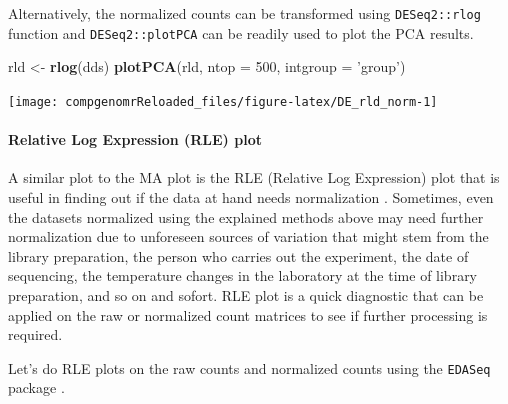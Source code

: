 \documentclass[12pt,]{krantz}
\newenvironment{Shaded}{\begin{snugshade}}{\end{snugshade}}
\newcommand{\DataTypeTok}[1]{\textcolor[rgb]{0.13,0.29,0.53}{#1}}
\newcommand{\DecValTok}[1]{\textcolor[rgb]{0.00,0.00,0.81}{#1}}
\newcommand{\KeywordTok}[1]{\textcolor[rgb]{0.13,0.29,0.53}{\textbf{#1}}}
\newcommand{\NormalTok}[1]{#1}
\newcommand{\StringTok}[1]{\textcolor[rgb]{0.31,0.60,0.02}{#1}}
\let\oldparagraph\paragraph
\renewcommand{\paragraph}[1]{\oldparagraph{#1}\mbox{}}
\begin{document}
Alternatively, the normalized counts can be transformed using \texttt{DESeq2::rlog} function and \texttt{DESeq2::plotPCA} can be readily used to plot the PCA results.

\begin{Shaded}
\begin{Highlighting}[]
\NormalTok{rld <-}\StringTok{ }\KeywordTok{rlog}\NormalTok{(dds)}
\KeywordTok{plotPCA}\NormalTok{(rld, }\DataTypeTok{ntop =} \DecValTok{500}\NormalTok{, }\DataTypeTok{intgroup =} \StringTok{'group'}\NormalTok{)}
\end{Highlighting}
\end{Shaded}

\begin{center}\texttt{[image: compgenomrReloaded\_files/figure-latex/DE\_rld\_norm-1]} \end{center}

\hypertarget{relative-log-expression-rle-plot}{%
\paragraph{Relative Log Expression (RLE) plot}\label{relative-log-expression-rle-plot}}

A similar plot to the MA plot is the RLE (Relative Log Expression) plot that is useful in finding out if the data at hand needs normalization \citep{gandolfo_rle_2018}. Sometimes, even the datasets normalized using the explained methods above may need further normalization due to unforeseen sources of variation that might stem from the library preparation, the person who carries out the experiment, the date of sequencing, the temperature changes in the laboratory at the time of library preparation, and so on and sofort. RLE plot is a quick diagnostic that can be applied on the raw or normalized count matrices to see if further processing is required.

Let's do RLE plots on the raw counts and normalized counts using the \texttt{EDASeq} package \citep{risso_gc-content_2011}.
\end{document}
